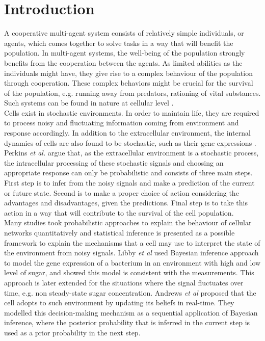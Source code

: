 \chapter{Introduction}
A cooperative multi-agent system consists of relatively simple individuals, or agents, which comes together to solve tasks in a way that will benefit the population. In multi-agent systems, the well-being of the population strongly benefits from the cooperation between the agents. As limited abilities as the individuals might have, they give rise to a complex behaviour of the population through cooperation. These complex behaviors might be crucial for the survival of the population, e.g. running away from predators, rationing of vital substances. Such systems can be found in nature at cellular level \cite{Perkins2009a}. \\
Cells exist in stochastic environments. In order to maintain life, they are required to process noisy and fluctuating information coming from environment and response accordingly. In addition to the extracellular environment, the internal dynamics of cells are also found to be stochastic, such as their gene expressions \cite{Shahrezaei2008}. \\
Perkins \textit{et al.} \cite{Perkins2009a} argue that, as the extracellular environment is a stochastic process, the intracellular processing of these stochastic signals and choosing an appropriate response can only be probabilistic and consists of three main steps. First step is to infer from the noisy signals and make a prediction of the current or future state. Second is to make a proper choice of action considering the advantages and disadvantages, given the predictions. Final step is to take this action in a way that will contribute to the survival of the cell population. \\
Many studies took probabilistic approaches to explain the behaviour of cellular networks quantitatively and statistical inference is presented as a possible framework to explain the mechanisms that a cell may use to interpret the state of the environment from noisy signals. Libby \textit{et al} \cite{Libby2007} used Bayesian inference approach to model the gene expression of a bacterium in an environment with high and low level of sugar, and showed this model is consistent with the measurements. This approach is later extended for the situations where the signal fluctuates over time, e.g. non steady-state sugar concentration. Andrews \textit{et al} \cite{Andrews2016} proposed that the cell adopts to such environment by updating its beliefs in real-time. They modelled this decision-making mechanism as a sequential application of Bayesian inference, where the posterior probability that is inferred in the current step is used as a prior probability in the next step.\\
